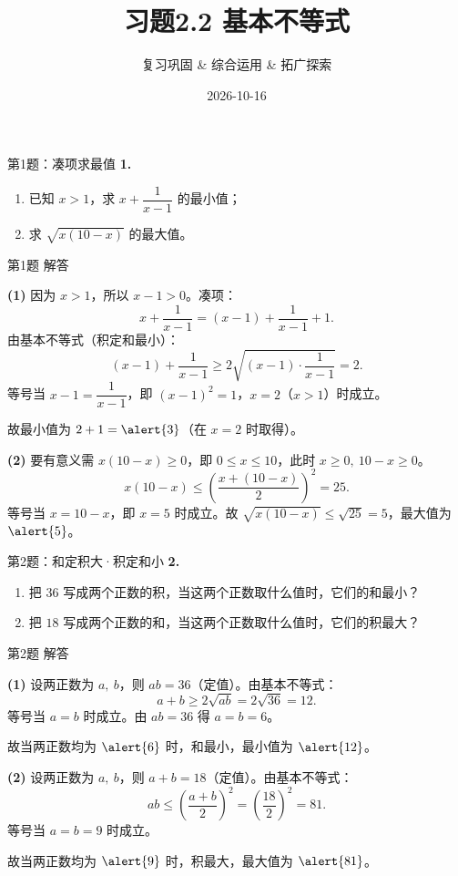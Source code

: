 \documentclass[10pt,aspectratio=169,serif]{beamer}
\title[习题2.2]{习题2.2 基本不等式}
\subtitle{复习巩固 \& 综合运用 \& 拓广探索}
\author{}
\institute{}
\date{2026-10-16}
\begin{document}
\begin{frame}
  \titlepage
\end{frame}

\begin{frame}[t]{第1题：凑项求最值}
\textbf{1.}
\begin{enumerate}[(1)]
  \item 已知 $x>1$，求 $x+\dfrac{1}{x-1}$ 的最小值；
  \item 求 $\sqrt{x(10-x)}$ 的最大值。
\end{enumerate}
\end{frame}

\begin{frame}[t]{第1题 解答}
\begin{tcolorbox}[colback=orange!10,colframe=orange,title=\textbf{解}]
\textbf{(1)} 因为 $x>1$，所以 $x-1>0$。凑项：
\[
x+\frac{1}{x-1}=(x-1)+\frac{1}{x-1}+1.
\]
由基本不等式（积定和最小）：
\[
(x-1)+\frac{1}{x-1}\ge 2\sqrt{(x-1)\cdot\frac{1}{x-1}}=2.
\]
等号当 $x-1=\dfrac{1}{x-1}$，即 $(x-1)^2=1$，$x=2$（$x>1$）时成立。

故最小值为 $2+1=\alert{3}$（在 $x=2$ 时取得）。

\vspace{0.5em}
\textbf{(2)} 要有意义需 $x(10-x)\ge 0$，即 $0\le x\le 10$，此时 $x\ge 0,\ 10-x\ge 0$。
\[
x(10-x)\le \left(\frac{x+(10-x)}{2}\right)^2=25.
\]
等号当 $x=10-x$，即 $x=5$ 时成立。故 $\sqrt{x(10-x)}\le\sqrt{25}=5$，最大值为 $\alert{5}$。
\end{tcolorbox}
\end{frame}

\begin{frame}[t]{第2题：和定积大·积定和小}
\textbf{2.}
\begin{enumerate}[(1)]
  \item 把 $36$ 写成两个正数的积，当这两个正数取什么值时，它们的和最小？
  \item 把 $18$ 写成两个正数的和，当这两个正数取什么值时，它们的积最大？
\end{enumerate}
\end{frame}

\begin{frame}[t]{第2题 解答}
\begin{tcolorbox}[colback=orange!10,colframe=orange,title=\textbf{解}]
\textbf{(1)} 设两正数为 $a,\ b$，则 $ab=36$（定值）。由基本不等式：
\[
a+b\ge 2\sqrt{ab}=2\sqrt{36}=12.
\]
等号当 $a=b$ 时成立。由 $ab=36$ 得 $a=b=6$。

故当两正数均为 $\alert{6}$ 时，和最小，最小值为 $\alert{12}$。

\vspace{0.5em}
\textbf{(2)} 设两正数为 $a,\ b$，则 $a+b=18$（定值）。由基本不等式：
\[
ab\le \left(\frac{a+b}{2}\right)^2=\left(\frac{18}{2}\right)^2=81.
\]
等号当 $a=b=9$ 时成立。

故当两正数均为 $\alert{9}$ 时，积最大，最大值为 $\alert{81}$。
\end{tcolorbox}
\end{frame}
\end{document}
